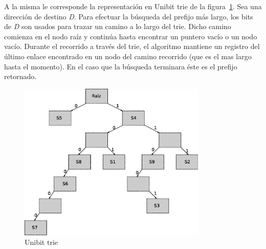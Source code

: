 A la misma le corresponde la representación en Unibit trie de la figura~\ref{fig:trie}.
Sea una dirección de destino \textit{D}. Para efectuar la búsqueda del prefijo más largo, los bits de \textit{D} son usados para trazar un camino a lo largo del trie. Dicho camino comienza en el nodo raíz y continúa hasta encontrar un puntero vacío o un nodo vacío. Durante el recorrido a través del trie, el algoritmo mantiene un registro del último enlace encontrado en un nodo del camino recorrido (que es el mas largo hasta el momento). En el caso que la búsqueda terminara éste es el prefijo retornado.
\begin{figure}[H]
  \centering
	\includegraphics[width=0.80\textwidth]{2-sistema/graf/trie.eps}
  \caption{Unibit trie}
  \label{fig:trie}
\end{figure}


